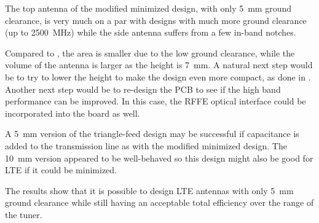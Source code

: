 The top antenna of the modified minimized design, with only \SI{5}{mm} ground clearance, is very much on a par with designs with much more ground clearance (up to \SI{2500}{MHz}) while the side antenna suffers from a few in-band notches. 

Compared to \cite{ilvonen2014multiband}, the area is smaller due to the low ground clearance, while the volume of the antenna is larger as the height is \SI{7}{mm}. A natural next step would be to try to lower the height to make the design even more compact, as done in \cite{ilvonen2014multiband}. Another next step would be to re-design the PCB to see if the high band performance can be improved. In this case, the RFFE optical interface could be incorporated into the board as well.

A \SI{5}{mm} version of the triangle-feed design may be successful if capacitance is added to the transmission line as with the modified minimized design. The \SI{10}{mm} version appeared to be well-behaved so this design might also be good for LTE if it could be minimized.

The results show that it is possible to design LTE antennas with only \SI{5}{mm} ground clearance while still having an acceptable total efficiency over the range of the tuner.

